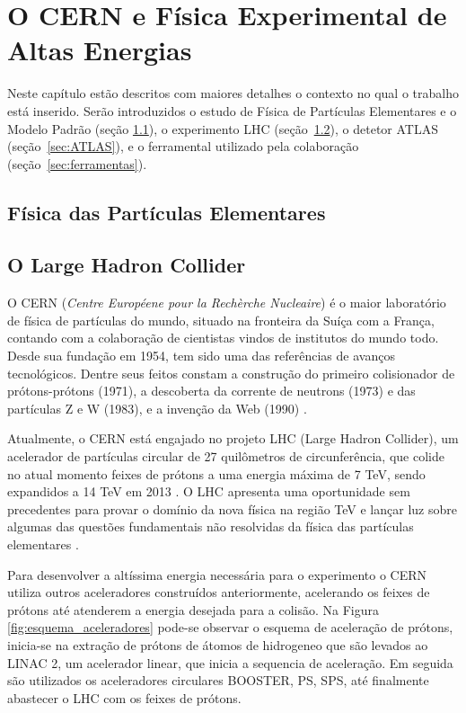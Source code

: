 \chapter{O CERN e Física Experimental de Altas Energias}

Neste capítulo estão descritos com maiores detalhes o contexto no qual o
trabalho está inserido. Serão introduzidos o estudo de Física de Partículas
Elementares e o Modelo Padrão (seção \ref{sec:fis_part}),
 o experimento LHC (seção~\ref{sec:lhc}), o detetor ATLAS 
(seção~\ref{sec:ATLAS}), e o ferramental utilizado pela colaboração
(seção~\ref{sec:ferramentas}). 

\section{Física das Partículas Elementares}
\label{sec:fis_part}


\section{O Large Hadron Collider}
\label{sec:lhc}


O CERN ({\it Centre Européene pour la Rechèrche Nucleaire}) é o maior
laboratório de física de partículas do mundo, situado na fronteira da Suíça com
a França, contando com a colaboração de cientistas vindos de institutos
do mundo todo. Desde sua fundação em 1954, tem sido uma das referências de
avanços tecnológicos. Dentre seus feitos constam a construção do primeiro 
colisionador de prótons-prótons (1971), a descoberta 
da corrente de neutrons (1973) e das partículas Z e W (1983), 
e a invenção da Web (1990) \cite{webCERN}.

Atualmente, o CERN está engajado no projeto LHC (Large Hadron
Collider), um acelerador de partículas circular de 27 quilômetros de
circunferência, que colide no atual momento feixes de prótons a uma energia
máxima de 7 TeV, sendo expandidos a 14 TeV em 2013 \cite{webATLAS}.
O LHC apresenta uma oportunidade sem precedentes para provar o domínio da
nova física na região TeV e lançar luz sobre algumas das questões fundamentais
não resolvidas da física das partículas elementares \cite{hunt_for_physics}. 

Para desenvolver a altíssima energia necessária para o experimento o CERN 
utiliza outros aceleradores construídos anteriormente, acelerando os feixes de prótons até atenderem
a energia desejada para a colisão. Na Figura \ref{fig:esquema_aceleradores} pode-se observar
o esquema de aceleração de prótons, inicia-se na extração de prótons de átomos
de hidrogeneo que são levados ao LINAC 2, um acelerador linear,
que inicia a sequencia de aceleração. Em seguida são utilizados os aceleradores
circulares BOOSTER, PS, SPS, até finalmente abastecer o LHC com os feixes de
prótons.

